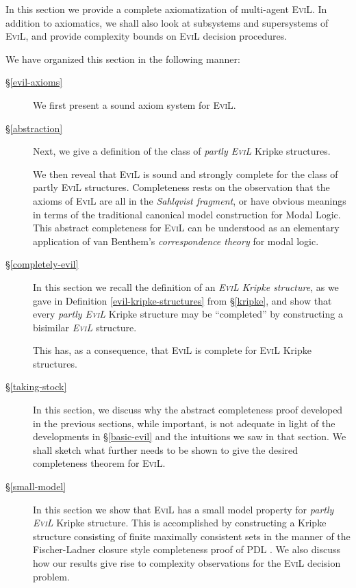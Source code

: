 In this section we provide a complete axiomatization of
multi-agent \textsc{EviL}.  In addition to axiomatics, we shall also
look at subsystems and supersystems of \textsc{EviL}, and provide
complexity bounds on \textsc{EviL} decision procedures. 

We have organized this section in the following manner:
\begin{description}
 \item[\S\ref{evil-axioms}] We first present a sound axiom
   system for \textsc{EviL}.

 \item[\S\ref{abstraction}] Next, we give a definition of the
   class of \emph{partly \textsc{EviL}} Kripke structures.  

   We then reveal that \textsc{EviL} is sound and strongly complete
   for the class of partly \textsc{EviL} structures. 
   Completeness rests on the observation that the
   axioms of \textsc{EviL} are all in the \emph{Sahlqvist fragment},
   or have obvious meanings in terms of the traditional canonical
   model construction for Modal Logic.
   This abstract completeness for \textsc{EviL} can be understood as
   an elementary application of van Benthem's 
   \emph{correspondence theory} for modal logic.

\item[\S\ref{completely-evil}]  In this section we recall the definition of an
  \emph{\textsc{EviL} Kripke structure}, as we gave in Definition
  \ref{evil-kripke-structures} from \S\ref{kripke}, and show that
  every \emph{partly \textsc{EviL}} Kripke structure may be
  ``completed'' by constructing a bisimilar \emph{\textsc{EviL}} 
   structure.

   This has, as a consequence, that \textsc{EviL} is complete for
   \textsc{EviL} Kripke structures.

\item[\S\ref{taking-stock}]  In this section, we discuss why the abstract
  completeness proof developed in the previous sections, while
  important, is not adequate in light of the developments in
  \S\ref{basic-evil} and the intuitions we saw in that section.  We
  shall sketch what further needs to be shown to give the desired
  completeness theorem for \textsc{EviL}.

\item[\S\ref{small-model}]  In this section we show that
  \textsc{EviL} has a small model property for \emph{partly
    \textsc{EviL}} Kripke structure. This is accomplished by constructing
     a Kripke structure consisting of finite maximally
     consistent sets in the manner of the Fischer-Ladner closure style
     completeness proof of PDL 
     \cite[chapter 4, pgs. 241--248]{blackburn_modal_2001}.
We also discuss how our results give rise to complexity observations for
  the \textsc{EviL} decision problem.


\end{description}
